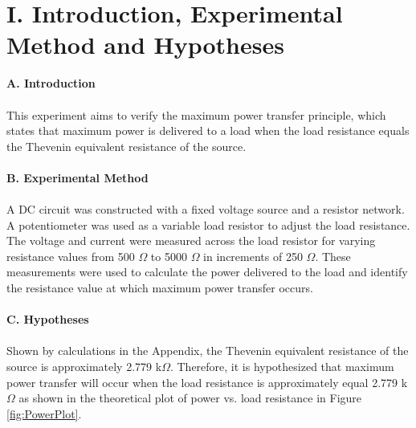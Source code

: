 \documentclass[12pt]{article}
\begin{document}
\section*{I. Introduction, Experimental Method and Hypotheses}
\textbf{A. Introduction}\\\\
This experiment aims to verify the maximum power transfer principle, which states that maximum power is delivered to a load when the load resistance equals the Thevenin equivalent resistance of the source.\\\\
\textbf{B. Experimental Method}\\\\
A DC circuit was constructed with a fixed voltage source and a resistor network. A potentiometer was used as a variable load resistor to adjust the load resistance. The voltage and current were measured across the load resistor for varying resistance values from 500 $\Omega$ to 5000 $\Omega$ in increments of 250 $\Omega$. These measurements were used to calculate the power delivered to the load and identify the resistance value at which maximum power transfer occurs.\\\\
\textbf{C. Hypotheses}\\\\
Shown by calculations in the Appendix, the Thevenin equivalent resistance of the source is approximately 2.779 k$\Omega$. Therefore, it is hypothesized that maximum power transfer will occur when the load resistance is approximately equal 2.779 k$\Omega$ as shown in the theoretical plot of power vs. load resistance in Figure \ref{fig:PowerPlot}.
\end{document}
